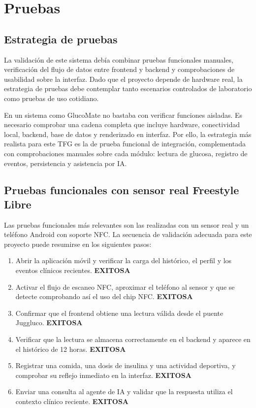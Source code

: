 \chapter{Pruebas}\label{cap:pruebas}

\section{Estrategia de pruebas}

La validación de este sistema debía combinar pruebas funcionales manuales, verificación del
flujo de datos entre frontend y backend y comprobaciones de usabilidad sobre la interfaz.
Dado que el proyecto depende de hardware real, la estrategia de pruebas debe contemplar
tanto escenarios controlados de laboratorio como pruebas de uso cotidiano.

En un sistema como GlucoMate no bastaba con verificar funciones aisladas. Es necesario
comprobar una cadena completa que incluye hardware, conectividad local, backend, base de
datos y renderizado en interfaz. Por ello, la estrategia más realista para este TFG es la
de prueba funcional de integración, complementada con comprobaciones manuales sobre cada
módulo: lectura de glucosa, registro de eventos, persistencia y asistencia por IA.

\section{Pruebas funcionales con sensor real Freestyle Libre}

Las pruebas funcionales más relevantes son las realizadas con un sensor real y un teléfono
Android con soporte NFC. La secuencia de validación adecuada para este proyecto puede
resumirse en los siguientes pasos:

\begin{enumerate}
    \item Abrir la aplicación móvil y verificar la carga del histórico, el perfil y los
          eventos clínicos recientes. \textbf{EXITOSA}
    \item Activar el flujo de escaneo NFC, aproximar el teléfono al sensor y que se detecte comprobando así el uso del chip NFC. \textbf{EXITOSA}
    \item Confirmar que el frontend obtiene una lectura válida desde el puente Juggluco. \textbf{EXITOSA}
    \item Verificar que la lectura se almacena correctamente en el backend y aparece en el
          histórico de 12 horas. \textbf{EXITOSA}
    \item Registrar una comida, una dosis de insulina y una actividad deportiva, y
          comprobar su reflejo inmediato en la interfaz. \textbf{EXITOSA}
    \item Enviar una consulta al agente de IA y validar que la respuesta utiliza el
          contexto clínico reciente. \textbf{EXITOSA}
\end{enumerate}

